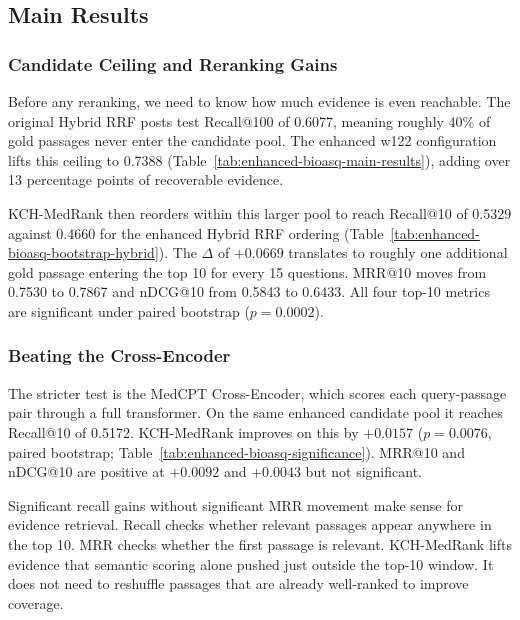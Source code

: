 \subsection{Main Results}
\label{sec:main-results}

\subsubsection{Candidate Ceiling and Reranking Gains}

Before any reranking, we need to know how much evidence is even reachable. The original Hybrid RRF posts test Recall@100 of 0.6077, meaning roughly 40\% of gold passages never enter the candidate pool. The enhanced w122 configuration lifts this ceiling to 0.7388 (Table~\ref{tab:enhanced-bioasq-main-results}), adding over 13 percentage points of recoverable evidence.



KCH-MedRank then reorders within this larger pool to reach Recall@10 of 0.5329 against 0.4660 for the enhanced Hybrid RRF ordering (Table~\ref{tab:enhanced-bioasq-bootstrap-hybrid}). The $\Delta$ of $+0.0669$ translates to roughly one additional gold passage entering the top 10 for every 15 questions. MRR@10 moves from 0.7530 to 0.7867 and nDCG@10 from 0.5843 to 0.6433. All four top-10 metrics are significant under paired bootstrap ($p=0.0002$).



\subsubsection{Beating the Cross-Encoder}

The stricter test is the MedCPT Cross-Encoder, which scores each query-passage pair through a full transformer. On the same enhanced candidate pool it reaches Recall@10 of 0.5172. KCH-MedRank improves on this by $+0.0157$ ($p=0.0076$, paired bootstrap; Table~\ref{tab:enhanced-bioasq-significance}). MRR@10 and nDCG@10 are positive at $+0.0092$ and $+0.0043$ but not significant.



Significant recall gains without significant MRR movement make sense for evidence retrieval. Recall checks whether relevant passages appear anywhere in the top 10. MRR checks whether the first passage is relevant. KCH-MedRank lifts evidence that semantic scoring alone pushed just outside the top-10 window. It does not need to reshuffle passages that are already well-ranked to improve coverage.

